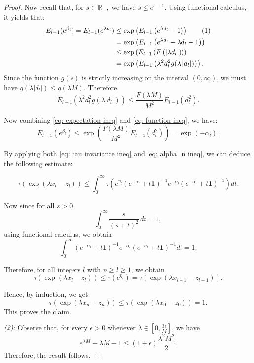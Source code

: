 \documentclass[10pt]{amsart}
\theoremstyle{definition}
\theoremstyle{myremark}
\numberwithin{equation}{section}
\def\R{\mathbb R}
\newcommand{\abs}[1]{\left\vert#1\right\vert}
\begin{document}
\begin{proof}
Now recall that, for $s\in \R_+,$ we have $s\le e^{s-1}.$ Using functional calculus, it yields that:
\begin{align*}
    E_{l-1}(e^{\beta_l}) =E_{l-1}(e^{\lambda d_l}) &\leq \exp\left( E_{    l-1}\left(e^{\lambda d_l} - 1\right) \right)\stepcounter{equation}\tag{\theequation}\label{eq: expectation ineq}\\
    &= \exp\left( E_{l-1}\left(e^{\lambda d_l} - \lambda d_l - 1\right) \right)\\
    &\le\exp\left( E_{l-1}\left(F\left(\abs{\lambda d_l}\right)\right) \right) \\
    &= \exp\left( E_{l-1}\left(\lambda^2d_l^2 g(\lambda \abs{d_l}) \right) \right).
\end{align*}
Since the function $g(s)$ is strictly increasing on the interval $(0, \infty)$, we must have $g(\lambda \abs{d_l}) \leq g(\lambda M)$. Therefore, 
\begin{equation}\label{eq: function ineq}
     E_{l-1}\left(\lambda^2d_l^2g\left(\lambda \abs{d_l}\right)\right)\le \frac{F(\lambda M)}{M^2}E_{l-1}\left(d_l^2\right).
\end{equation}

Now combining \cref{eq: expectation ineq} and \cref{eq: function ineq}, we have:
\begin{equation}\label{eq: alpha_n ineq}
    E_{l-1}\left(e^{\beta_l}\right)\le \exp\left(\frac{F(\lambda M)}{M^2}E_{l-1}\left(d_l^2\right)\right)=\exp\left(-\alpha_l\right).
\end{equation}

By applying both \cref{eq: tau invariance ineq} and \cref{eq: alpha_n ineq}, we can deduce the following estimate:

$$
\tau\left( \exp(\lambda x_l - z_l) \right) \leq \int_0^{\infty} \tau\left( e^{\eta_l} (e^{-\alpha_l} + t\mathbf{1})^{-1} e^{-\alpha_l} (e^{-\alpha_l} + t\mathbf{1})^{-1} \right) dt.
$$

Now since for all $s>0$
$$
\int_0^\infty \frac{s}{(s + t)^2} \, dt = 1,
$$ 
using functional calculus, we obtain 
\[
\int_0^{\infty}   (e^{-\alpha_l} + t\mathbf{1})^{-1} e^{-\alpha_l} (e^{-\alpha_l} + t\mathbf{1})^{-1}  dt=1.
\]

Therefore, for all integers $l$ with  $n\geq l\geq 1$, we obtain
$$
\tau\left(\exp(\lambda x_l - z_l)\right) \leq \tau(e^{\eta_l})= \tau\left(\exp(\lambda x_{l-1} - z_{l-1})\right).
$$

Hence, by induction, we get
$$
\tau\left(\exp(\lambda x_n - z_n)\right) \leq \tau\left(\exp(\lambda x_0 - z_0)\right)=1.
$$
This proves the claim.

    \emph{(2):} Observe that, for every $\epsilon>0$ whenever $\lambda \in \left[ 0, \frac{3 \epsilon}{M} \right]$, we have    
        $$e^{\lambda M} - \lambda M -1 \leq (1+ \epsilon) \frac{\lambda^2 M^2}{2}.$$    
    Therefore, the result follows.
\end{proof}
\end{document}
